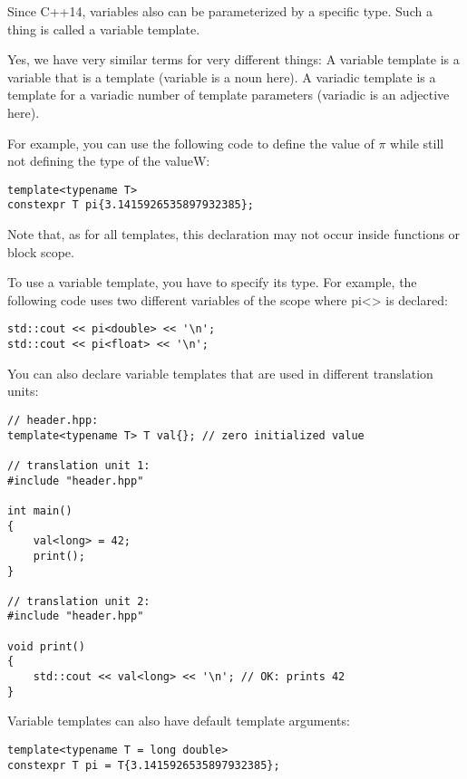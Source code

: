 Since C++14, variables also can be parameterized by a specific type. Such a thing is called a variable template.

\begin{tcolorbox}[colback=webgreen!5!white,colframe=webgreen!75!black]
\hspace*{0.75cm}Yes, we have very similar terms for very different things: A variable template is a variable that is a template (variable is a noun here). A variadic template is a template for a variadic number of template parameters (variadic is an adjective here).
\end{tcolorbox}

For example, you can use the following code to define the value of $\pi$ while still not defining the type of the valueW:

\begin{lstlisting}[style=styleCXX]
template<typename T>
constexpr T pi{3.1415926535897932385};
\end{lstlisting}

Note that, as for all templates, this declaration may not occur inside functions or block scope.

To use a variable template, you have to specify its type. For example, the following code uses two different variables of the scope where pi<> is declared:

\begin{lstlisting}[style=styleCXX]
std::cout << pi<double> << '\n';
std::cout << pi<float> << '\n';
\end{lstlisting}

You can also declare variable templates that are used in different translation units:

\begin{lstlisting}[style=styleCXX]
// header.hpp:
template<typename T> T val{}; // zero initialized value

// translation unit 1:
#include "header.hpp"

int main()
{
	val<long> = 42;
	print();
}

// translation unit 2:
#include "header.hpp"

void print()
{
	std::cout << val<long> << '\n'; // OK: prints 42
}
\end{lstlisting}

Variable templates can also have default template arguments:

\begin{lstlisting}[style=styleCXX]
template<typename T = long double>
constexpr T pi = T{3.1415926535897932385};
\end{lstlisting}

